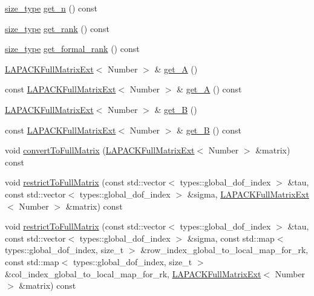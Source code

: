 \begin{DoxyCompactItemize}
\item 
\hyperlink{classRkMatrix_add060bfc3a4cc77f858c3d6dd58cadd5}{size\+\_\+type} \hyperlink{classRkMatrix_a4f719c760482c2ab75cc5647277a9cdd}{get\+\_\+n} () const
\item 
\hyperlink{classRkMatrix_add060bfc3a4cc77f858c3d6dd58cadd5}{size\+\_\+type} \hyperlink{classRkMatrix_a1b2231c1e02862c91f4451e2b0a5fab4}{get\+\_\+rank} () const
\item 
\hyperlink{classRkMatrix_add060bfc3a4cc77f858c3d6dd58cadd5}{size\+\_\+type} \hyperlink{classRkMatrix_ae69122e3ee1c49a4fbe48cf3d7a20581}{get\+\_\+formal\+\_\+rank} () const
\item 
\hyperlink{classLAPACKFullMatrixExt}{L\+A\+P\+A\+C\+K\+Full\+Matrix\+Ext}$<$ Number $>$ \& \hyperlink{classRkMatrix_accfea435fd26c622e491bee475ae788c}{get\+\_\+A} ()
\item 
const \hyperlink{classLAPACKFullMatrixExt}{L\+A\+P\+A\+C\+K\+Full\+Matrix\+Ext}$<$ Number $>$ \& \hyperlink{classRkMatrix_a95e786794895f1ceae2e0f2880e105b3}{get\+\_\+A} () const
\item 
\hyperlink{classLAPACKFullMatrixExt}{L\+A\+P\+A\+C\+K\+Full\+Matrix\+Ext}$<$ Number $>$ \& \hyperlink{classRkMatrix_aca855d29d0dd3036ba75d0e3ca75d88e}{get\+\_\+B} ()
\item 
const \hyperlink{classLAPACKFullMatrixExt}{L\+A\+P\+A\+C\+K\+Full\+Matrix\+Ext}$<$ Number $>$ \& \hyperlink{classRkMatrix_a69695b04d890d753bd3343e4665ca0ba}{get\+\_\+B} () const
\item 
void \hyperlink{classRkMatrix_a384cdf3033d98f90b80d373add20b556}{convert\+To\+Full\+Matrix} (\hyperlink{classLAPACKFullMatrixExt}{L\+A\+P\+A\+C\+K\+Full\+Matrix\+Ext}$<$ Number $>$ \&matrix) const
\item 
void \hyperlink{classRkMatrix_a5305306386e47bcded819ce8d7f7935c}{restrict\+To\+Full\+Matrix} (const std\+::vector$<$ types\+::global\+\_\+dof\+\_\+index $>$ \&tau, const std\+::vector$<$ types\+::global\+\_\+dof\+\_\+index $>$ \&sigma, \hyperlink{classLAPACKFullMatrixExt}{L\+A\+P\+A\+C\+K\+Full\+Matrix\+Ext}$<$ Number $>$ \&matrix) const
\item 
void \hyperlink{classRkMatrix_a0c529b22a8a38c4046a93c4a16ad39ca}{restrict\+To\+Full\+Matrix} (const std\+::vector$<$ types\+::global\+\_\+dof\+\_\+index $>$ \&tau, const std\+::vector$<$ types\+::global\+\_\+dof\+\_\+index $>$ \&sigma, const std\+::map$<$ types\+::global\+\_\+dof\+\_\+index, size\+\_\+t $>$ \&row\+\_\+index\+\_\+global\+\_\+to\+\_\+local\+\_\+map\+\_\+for\+\_\+rk, const std\+::map$<$ types\+::global\+\_\+dof\+\_\+index, size\+\_\+t $>$ \&col\+\_\+index\+\_\+global\+\_\+to\+\_\+local\+\_\+map\+\_\+for\+\_\+rk, \hyperlink{classLAPACKFullMatrixExt}{L\+A\+P\+A\+C\+K\+Full\+Matrix\+Ext}$<$ Number $>$ \&matrix) const

\end{DoxyCompactItemize}

